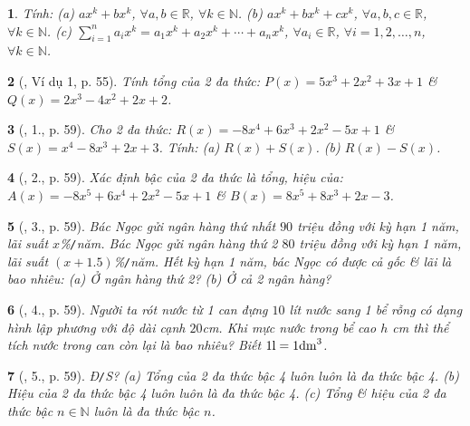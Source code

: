 \documentclass{article}
\newtheorem{baitoan}{}
\begin{document}
\begin{baitoan}
	Tính: (a) $ax^k + bx^k$, $\forall a,b\in\mathbb{R}$, $\forall k\in\mathbb{N}$. (b) $ax^k + bx^k + cx^k$, $\forall a,b,c\in\mathbb{R}$, $\forall k\in\mathbb{N}$. (c) $\sum_{i=1}^n a_ix^k = a_1x^k + a_2x^k + \cdots + a_nx^k$, $\forall a_i\in\mathbb{R}$, $\forall i = 1,2,\ldots,n$, $\forall k\in\mathbb{N}$.
\end{baitoan}

\begin{baitoan}[\cite{SGK_Toan_7_Canh_Dieu_tap_2}, Ví dụ 1, p. 55]
	Tính tổng của 2 đa thức: $P(x) = 5x^3 + 2x^2 + 3x + 1$ \& $Q(x) = 2x^3 - 4x^2 + 2x + 2$.
\end{baitoan}

\begin{baitoan}[\cite{SGK_Toan_7_Canh_Dieu_tap_2}, 1., p. 59]
	Cho 2 đa thức: $R(x) = -8x^4 + 6x^3 + 2x^2 - 5x + 1$ \& $S(x) = x^4 - 8x^3 + 2x + 3$. Tính: (a) $R(x) + S(x)$. (b) $R(x) - S(x)$.
\end{baitoan}

\begin{baitoan}[\cite{SGK_Toan_7_Canh_Dieu_tap_2}, 2., p. 59]
	Xác định bậc của 2 đa thức là tổng, hiệu của: $A(x) = -8x^5 + 6x^4 + 2x^2 - 5x + 1$ \& $B(x) = 8x^5 + 8x^3 + 2x - 3$.
\end{baitoan}

\begin{baitoan}[\cite{SGK_Toan_7_Canh_Dieu_tap_2}, 3., p. 59]
	Bác Ngọc gửi ngân hàng thứ nhất $90$ triệu đồng với kỳ hạn 1 năm, lãi suất $x$\%\emph{\texttt{/}}năm. Bác Ngọc gửi ngân hàng thứ 2 $80$ triệu đồng với kỳ hạn 1 năm, lãi suất $(x + 1.5)$\%\emph{\texttt{/}}năm. Hết kỳ hạn 1 năm, bác Ngọc có được cả gốc \& lãi là bao nhiêu: (a) Ở ngân hàng thứ 2? (b) Ở cả 2 ngân hàng?
\end{baitoan}

\begin{baitoan}[\cite{SGK_Toan_7_Canh_Dieu_tap_2}, 4., p. 59]
	Người ta rót nước từ 1 can đựng $10$ lít nước sang 1 bể rỗng có dạng hình lập phương với độ dài cạnh $20$\emph{cm}. Khi mực nước trong bể cao $h$ \emph{cm} thì thể tích nước trong can còn lại là bao nhiêu? Biết $1{\rm l} = 1{\rm dm}^3$.
\end{baitoan}

\begin{baitoan}[\cite{SGK_Toan_7_Canh_Dieu_tap_2}, 5., p. 59]
	\emph{Đ\texttt{/}S?} (a) Tổng của 2 đa thức bậc 4 luôn luôn là đa thức bậc 4. (b) Hiệu của 2 đa thức bậc 4 luôn luôn là đa thức bậc 4. (c) Tổng \& hiệu của 2 đa thức bậc $n\in\mathbb{N}$ luôn là đa thức bậc $n$.
\end{baitoan}
\end{document}
